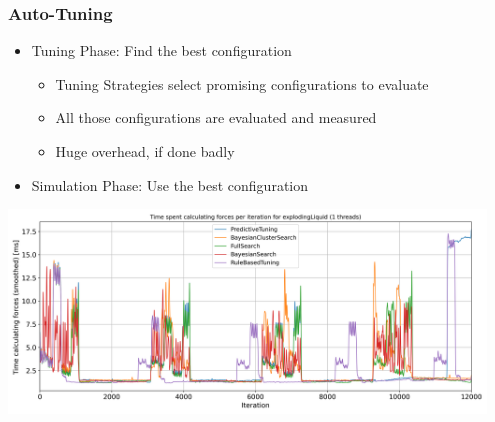 \documentclass[
	10pt,
	t		%
]{beamer}
\begin{document}
\begin{frame}
	\frametitle{Auto-Tuning }

	\begin{itemize}
		\item Tuning Phase: Find the best configuration
		      \begin{itemize}
			      \item Tuning Strategies select promising configurations to evaluate
			      \item All those configurations are evaluated and measured
			      \item Huge overhead, if done badly
		      \end{itemize}
		\item Simulation Phase: Use the best configuration
	\end{itemize}

	\vspace{0.1cm}

	\begin{center}
		\includegraphics[width=0.95\textwidth,trim={0 0 0 0.85cm},clip]{figures/timing_explodingLiquid.png}
	\end{center}


\end{frame}
\end{document}
